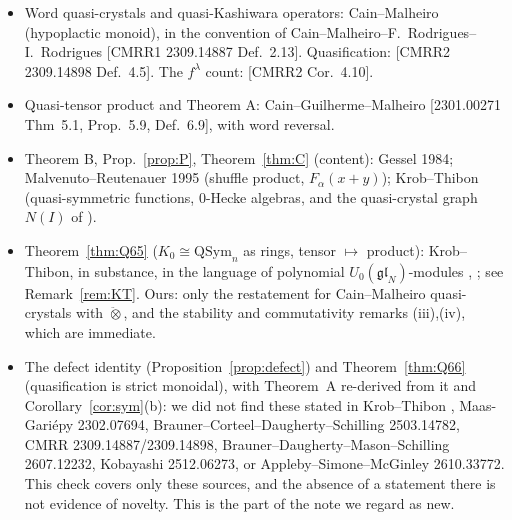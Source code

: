 \documentclass[11pt]{amsart}
\theoremstyle{definition}
\theoremstyle{remark}
\newcommand{\qt}{\mathbin{\ddot\otimes}}
\newcommand{\QSym}{\mathrm{QSym}}
\begin{document}
\begin{itemize}[leftmargin=*]
\item Word quasi-crystals and quasi-Kashiwara operators: Cain--Malheiro (hypoplactic monoid), in the convention of Cain--Malheiro--F.~Rodrigues--I.~Rodrigues [CMRR1 2309.14887 Def.~2.13]. Quasification: [CMRR2 2309.14898 Def.~4.5]. The $f^\lambda$ count: [CMRR2 Cor.~4.10].
\item Quasi-tensor product and Theorem A: Cain--Guilherme--Malheiro [2301.00271 Thm~5.1, Prop.~5.9, Def.~6.9], with word reversal.
\item Theorem B, Prop.~\ref{prop:P}, Theorem~\ref{thm:C} (content): Gessel 1984; Malvenuto--Reutenauer 1995 (shuffle product, $F_\alpha(x+y)$); Krob--Thibon \cite{KT4,KT5} (quasi-symmetric functions, $0$-Hecke algebras, and the quasi-crystal graph $N(I)$ of \cite[\S7]{KT5}).
\item Theorem~\ref{thm:Q65} ($K_0\cong\QSym_n$ as rings, tensor $\mapsto$ product): Krob--Thibon, in substance, in the language of polynomial $U_0(\mathfrak{gl}_N)$-modules \cite[Prop.~6.1, Conj.~6.13, Note~6.14]{KT4}, \cite[Props.~7.1, 7.3]{KT5}; see Remark~\ref{rem:KT}. Ours: only the restatement for Cain--Malheiro quasi-crystals with $\qt$, and the stability and commutativity remarks (iii),(iv), which are immediate.
\item The defect identity (Proposition~\ref{prop:defect}) and Theorem~\ref{thm:Q66} (quasification is strict monoidal), with Theorem~A re-derived from it and Corollary~\ref{cor:sym}(b): we did not find these stated in Krob--Thibon \cite{KT4,KT5}, Maas-Gari\'epy 2302.07694, Brauner--Corteel--Daugherty--Schilling 2503.14782, CMRR 2309.14887/2309.14898, Brauner--Daugherty--Mason--Schilling 2607.12232, Kobayashi 2512.06273, or Appleby--Simone--McGinley 2610.33772. This check covers only these sources, and the absence of a statement there is not evidence of novelty. This is the part of the note we regard as new.
\end{itemize}

\end{document}
